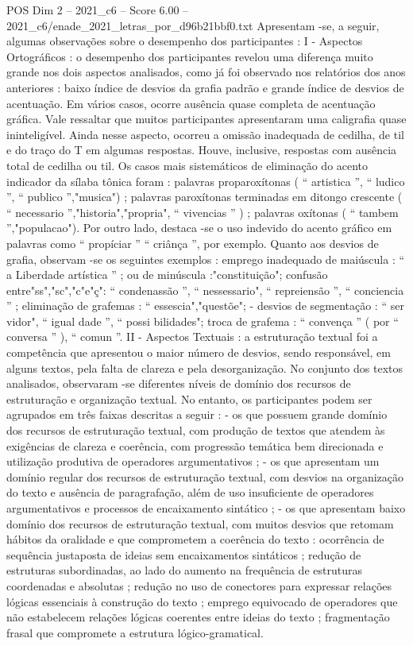 \begin{textsample}{POS Dim 2 – 2021\_c6 – Score 6.00 – 2021\_c6/enade\_2021\_letras\_por\_d96b21bbf0.txt}
Apresentam -se, a seguir, algumas observações sobre o desempenho dos participantes : I - Aspectos Ortográficos : o desempenho dos participantes revelou uma diferença muito grande nos dois aspectos analisados, como já foi observado nos relatórios dos anos anteriores : baixo índice de desvios da grafia padrão e grande índice de desvios de acentuação.
Em vários casos, ocorre ausência quase completa de acentuação gráfica.
Vale ressaltar que muitos participantes apresentaram uma caligrafia quase ininteligível.
Ainda nesse aspecto, ocorreu a omissão inadequada de cedilha, de til e do traço do T em algumas respostas.
Houve, inclusive, respostas com ausência total de cedilha ou til.
Os casos mais sistemáticos de eliminação do acento indicador da sílaba tônica foram : palavras proparoxítonas ( “ artistica ”, “ ludico ”, “ publico ”,"musica") ; palavras paroxítonas terminadas em ditongo crescente ( “ necessario ”,"historia","propria", “ vivencias ” ) ; palavras oxítonas ( “ tambem ”,"populacao").
Por outro lado, destaca -se o uso indevido do acento gráfico em palavras como “ propíciar ” “ criânça ”, por exemplo.
Quanto aos desvios de grafia, observam -se os seguintes exemplos : emprego inadequado de maiúscula : “ a Liberdade artística ” ; ou de minúscula :"constituição"; confusão entre"ss","sc","c"e"ç": “ condenassão ”, “ nessessario", “ repreiensão ”, “ conciencia ” ; eliminação de grafemas : “ essescia","questõe"; - desvios de segmentação : “ ser vidor", “ igual dade ”, “ possi bilidades"; troca de grafema : “ convença ” ( por “ conversa ” ), “ comun ”.
II - Aspectos Textuais : a estruturação textual foi a competência que apresentou o maior número de desvios, sendo responsável, em alguns textos, pela falta de clareza e pela desorganização.
No conjunto dos textos analisados, observaram -se diferentes níveis de domínio dos recursos de estruturação e organização textual.
No entanto, os participantes podem ser agrupados em três faixas descritas a seguir : - os que possuem grande domínio dos recursos de estruturação textual, com produção de textos que atendem às exigências de clareza e coerência, com progressão temática bem direcionada e utilização produtiva de operadores argumentativos ; - os que apresentam um domínio regular dos recursos de estruturação textual, com desvios na organização do texto e ausência de paragrafação, além de uso insuficiente de operadores argumentativos e processos de encaixamento sintático ; - os que apresentam baixo domínio dos recursos de estruturação textual, com muitos desvios que retomam hábitos da oralidade e que comprometem a coerência do texto : ocorrência de sequência justaposta de ideias sem encaixamentos sintáticos ; redução de estruturas subordinadas, ao lado do aumento na frequência de estruturas coordenadas e absolutas ; redução no uso de conectores para expressar relações lógicas essenciais à construção do texto ; emprego equivocado de operadores que não estabelecem relações lógicas coerentes entre ideias do texto ; fragmentação frasal que compromete a estrutura lógico-gramatical.

\end{textsample}
